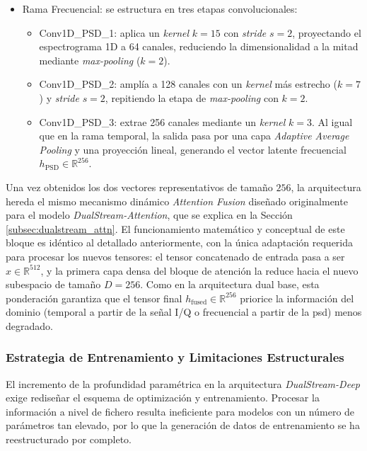 \begin{itemize}
    \item Rama Frecuencial: se estructura en tres etapas convolucionales:
    \begin{itemize}
        \item Conv1D\_PSD\_1: aplica un \textit{kernel} $k=15$ con \textit{stride} $s=2$, proyectando el espectrograma 1D a 64 canales, reduciendo la dimensionalidad a la mitad mediante \textit{max-pooling} ($k=2$).
        \item Conv1D\_PSD\_2: amplía a 128 canales con un \textit{kernel} más estrecho ($k=7$) y \textit{stride} $s=2$, repitiendo la etapa de \textit{max-pooling} con $k=2$.
        \item Conv1D\_PSD\_3: extrae 256 canales mediante un \textit{kernel} $k=3$. Al igual que en la rama temporal, la salida pasa por una capa \textit{Adaptive Average Pooling} y una proyección lineal, generando el vector latente frecuencial $h_{\text{PSD}} \in \mathbb{R}^{256}$.
    \end{itemize}
\end{itemize}

Una vez obtenidos los dos vectores representativos de tamaño $256$, la arquitectura hereda el mismo mecanismo dinámico \textit{Attention Fusion} diseñado originalmente para el modelo \textit{DualStream-Attention}, que se explica en la Sección \ref{subsec:dualstream_attn}. El funcionamiento matemático y conceptual de este bloque es idéntico al detallado anteriormente, con la única adaptación requerida para procesar los nuevos tensores: el tensor concatenado de entrada pasa a ser $x \in \mathbb{R}^{512}$, y la primera capa densa del bloque de atención la reduce hacia el nuevo subespacio de tamaño $D=256$. Como en la arquitectura dual base, esta ponderación garantiza que el tensor final $h_{\text{fused}} \in \mathbb{R}^{256}$ priorice la información del dominio (temporal a partir de la señal I/Q o frecuencial a partir de la \gls{psd}) menos degradado.

\subsubsection{Estrategia de Entrenamiento y Limitaciones Estructurales}
El incremento de la profundidad paramétrica en la arquitectura \textit{DualStream-Deep} exige rediseñar el esquema de optimización y entrenamiento. Procesar la información a nivel de fichero resulta ineficiente para modelos con un número de parámetros tan elevado, por lo que la generación de datos de entrenamiento se ha reestructurado por completo.

